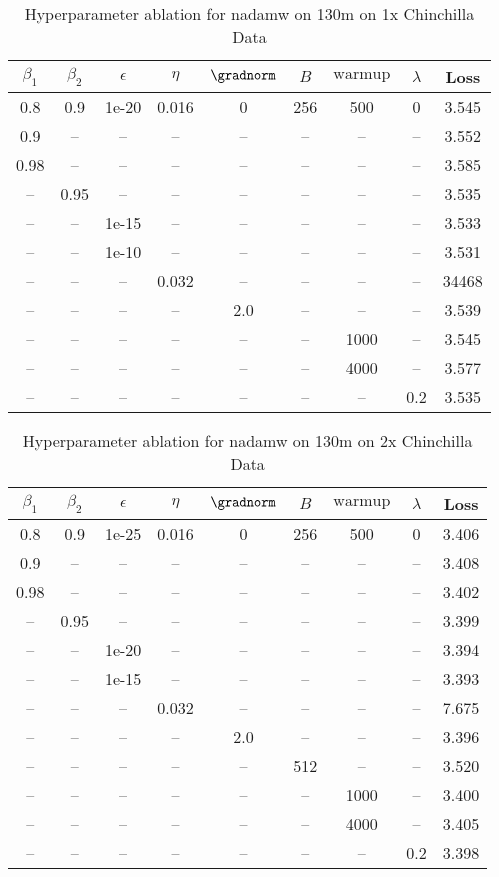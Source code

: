 \begin{table}[h!]
\centering
\caption{Hyperparameter ablation for nadamw on 130m on 1x Chinchilla Data}
\label{tab:ablation_nadamw_130m_on_1x_chinchilla_data}
\begin{tabular}{ccccccccc}
\toprule
$\beta_1$ & $\beta_2$ & $\epsilon$ & $\eta$ & $\gradnorm$ & $B$ & $\mathrm{warmup}$ & $\lambda$ & Loss \\
\midrule
0.8 & 0.9 & 1e-20 & 0.016 & 0 & 256 & 500 & 0 & 3.545 \\
\midrule
0.9 & -- & -- & -- & -- & -- & -- & -- & 3.552 \\
0.98 & -- & -- & -- & -- & -- & -- & -- & 3.585 \\
-- & 0.95 & -- & -- & -- & -- & -- & -- & 3.535 \\
-- & -- & 1e-15 & -- & -- & -- & -- & -- & 3.533 \\
-- & -- & 1e-10 & -- & -- & -- & -- & -- & 3.531 \\
-- & -- & -- & 0.032 & -- & -- & -- & -- & 34468 \\
-- & -- & -- & -- & 2.0 & -- & -- & -- & 3.539 \\
-- & -- & -- & -- & -- & -- & 1000 & -- & 3.545 \\
-- & -- & -- & -- & -- & -- & 4000 & -- & 3.577 \\
-- & -- & -- & -- & -- & -- & -- & 0.2 & 3.535 \\
\bottomrule
\end{tabular}
\end{table}

\begin{table}[h!]
\centering
\caption{Hyperparameter ablation for nadamw on 130m on 2x Chinchilla Data}
\label{tab:ablation_nadamw_130m_on_2x_chinchilla_data}
\begin{tabular}{ccccccccc}
\toprule
$\beta_1$ & $\beta_2$ & $\epsilon$ & $\eta$ & $\gradnorm$ & $B$ & $\mathrm{warmup}$ & $\lambda$ & Loss \\
\midrule
0.8 & 0.9 & 1e-25 & 0.016 & 0 & 256 & 500 & 0 & 3.406 \\
\midrule
0.9 & -- & -- & -- & -- & -- & -- & -- & 3.408 \\
0.98 & -- & -- & -- & -- & -- & -- & -- & 3.402 \\
-- & 0.95 & -- & -- & -- & -- & -- & -- & 3.399 \\
-- & -- & 1e-20 & -- & -- & -- & -- & -- & 3.394 \\
-- & -- & 1e-15 & -- & -- & -- & -- & -- & 3.393 \\
-- & -- & -- & 0.032 & -- & -- & -- & -- & 7.675 \\
-- & -- & -- & -- & 2.0 & -- & -- & -- & 3.396 \\
-- & -- & -- & -- & -- & 512 & -- & -- & 3.520 \\
-- & -- & -- & -- & -- & -- & 1000 & -- & 3.400 \\
-- & -- & -- & -- & -- & -- & 4000 & -- & 3.405 \\
-- & -- & -- & -- & -- & -- & -- & 0.2 & 3.398 \\
\bottomrule
\end{tabular}
\end{table}

